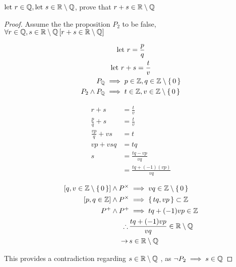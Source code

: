 \question ${\text{let } } r \in {\mathbb Q}, {\text{let } } s \in {\mathbb R}\setminus{\mathbb Q}$, prove that $r+s \in {\mathbb R}\setminus{\mathbb Q}$

\begin{proof}
	Assume the the proposition $P_2$ to be false, $\forall r \in {\mathbb Q}, s \in {\mathbb R}\setminus{\mathbb Q} \,{ \left[ {r+s \in {\mathbb R}\setminus{\mathbb Q}} \right] }$

	\begin{gather*}
		{\text{let } } r  = \frac{p}{q} \\
		{\text{let } } r+s = \frac{t}{v} \\
		\begin{split}
			P_{{\mathbb Q}}            & \implies p \in {\mathbb Z}, q \in {\mathbb Z}\setminus\set{0}  \\
			P_2 \wedge P_{{\mathbb Q}} & \implies  t \in {\mathbb Z}, v \in {\mathbb Z}\setminus\set{0}
		\end{split}
	\end{gather*}

	\begin{align*}
		r + s             & = \frac{t}{v}               \\
		\frac{p}{q} + s   & = \frac{t}{v}               \\
		\frac{vp}{q} + vs & = t                         \\
		vp + vsq          & = tq                        \\
		s                 & = \frac{tq-vp}{vq}          \\
		                  & = \frac{tq + (-1)(vp) }{vq}
	\end{align*}

	\begin{align*}
		{ \left[ {q,v \in {\mathbb Z}\setminus \set{0} } \right] } \wedge P^{\times} & \implies vq \in {\mathbb Z} \setminus \set{0}   \\
		{ \left[ {p,q\in {\mathbb Z}} \right] } \wedge P^{\times}                     & \implies \set{tq, vp} \subset {\mathbb Z}       \\
		P^{+} \wedge P^{+}                                   & \implies tq+(-1)vp \in {\mathbb Z}              \\
		\therefore\,                                         & \frac{tq+(-1)vp}{vq} \in {\mathbb R}\setminus{\mathbb Q}
		\\ \rightarrow\,& s \in {\mathbb R}\setminus{\mathbb Q}
	\end{align*}

	This provides a contradiction regarding $s\in{\mathbb R}\setminus{\mathbb Q}$ , as $\neg P_2 \implies s \in {\mathbb Q}$
\end{proof}
